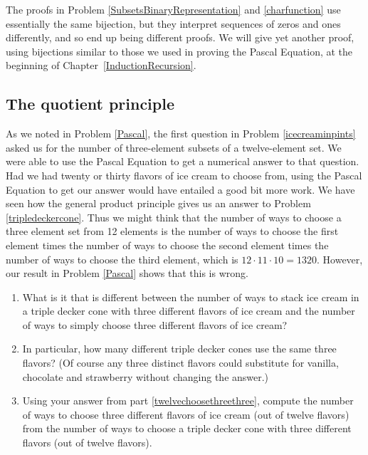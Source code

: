 The proofs in Problem \ref{SubsetsBinaryRepresentation} and
\ref{charfunction} use essentially the same bijection, but they
interpret sequences of zeros and ones differently, and so end up being
different proofs. We will give yet another proof, using bijections
similar to those we used in proving the Pascal Equation, at the
beginning of Chapter~\ref{InductionRecursion}.


\subsection{The quotient principle}

\bp
\iteme As we noted in Problem \ref{Pascal}, the first question in
Problem \ref{icecreaminpints} asked us for the number of three-element
subsets of a twelve-element set.  We were able to use the Pascal Equation to
get a numerical answer to that question.  Had we had twenty or thirty flavors
of ice cream to choose from, using the Pascal Equation to get our answer
would have entailed a good bit more work. We have seen how the general
product principle gives us an answer to Problem \ref{tripledeckercone}.  Thus
we might think that the number of ways to choose a three element set from 12
elements is the number of ways to choose the first element times the number
of ways to choose the second element times the number of ways to choose the
third element, which is $12\cdot11\cdot10=1320$.  However, our result in
Problem \ref{Pascal} shows that this is wrong. \label{twelvechoosethree}
\begin{enumerate}
\item What is it that is different between the number of ways to stack
  ice cream in a triple decker cone with three different flavors of
  ice cream and the number of ways to simply choose three different
  flavors of ice cream? 
\item  In particular, how many different triple
  decker cones use the same three flavors?  (Of course any three
  distinct flavors could substitute for vanilla, chocolate and
  strawberry without changing the answer.)\label{twelvechoosethreethree}
\item Using your answer from part \ref{twelvechoosethreethree},
  compute the number of ways to choose three different flavors of ice
  cream (out of twelve flavors) from the number of ways to choose a
  triple decker cone with three different flavors (out of twelve
  flavors).\label{twelvechoosethreefinal}
\end{enumerate}

